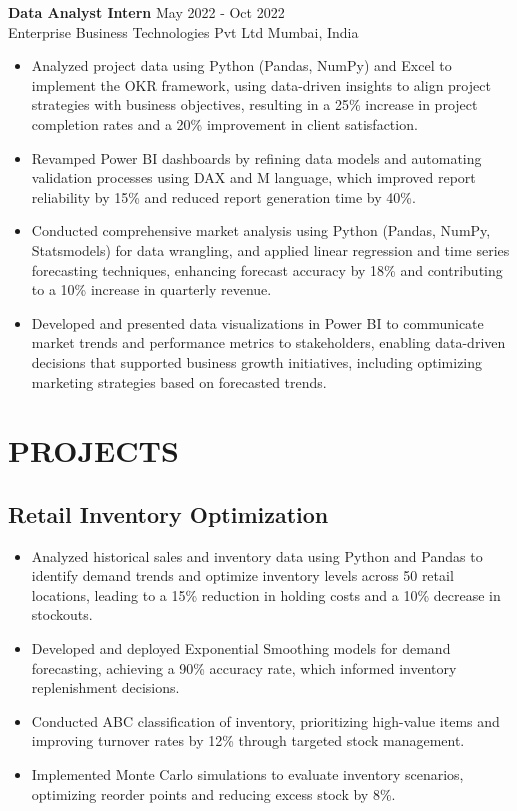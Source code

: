 \documentclass[12pt,a4paper]{article}
\newcommand{\workexp}[4]{
  \textbf{#1} \hfill #2\\
  #3 \hfill #4\\
  \vspace{-1em} %
}
\begin{document}
\workexp{Data Analyst Intern}{May 2022 - Oct 2022}{Enterprise Business Technologies Pvt Ltd}{Mumbai, India}
\begin{itemize}[leftmargin=*,noitemsep,topsep=0pt]
\item Analyzed project data using Python (Pandas, NumPy) and Excel to implement the OKR framework, using data-driven insights to align project strategies with business objectives, resulting in a 25\% increase in project completion rates and a 20\% improvement in client satisfaction.
\item Revamped Power BI dashboards by refining data models and automating validation processes using DAX and M language, which improved report reliability by 15\% and reduced report generation time by 40\%.
\item Conducted comprehensive market analysis using Python (Pandas, NumPy, Statsmodels) for data wrangling, and applied linear regression and time series forecasting techniques, enhancing forecast accuracy by 18\% and contributing to a 10\% increase in quarterly revenue.
\item Developed and presented data visualizations in Power BI to communicate market trends and performance metrics to stakeholders, enabling data-driven decisions that supported business growth initiatives, including optimizing marketing strategies based on forecasted trends.
\end{itemize}

\section*{PROJECTS}

\subsection*{Retail Inventory Optimization}
\begin{itemize}[leftmargin=*,noitemsep,topsep=0pt]
\item Analyzed historical sales and inventory data using Python and Pandas to identify demand trends and optimize inventory levels across 50 retail locations, leading to a 15\% reduction in holding costs and a 10\% decrease in stockouts.
\item Developed and deployed Exponential Smoothing models for demand forecasting, achieving a 90\% accuracy rate, which informed inventory replenishment decisions.
\item Conducted ABC classification of inventory, prioritizing high-value items and improving turnover rates by 12\% through targeted stock management.
\item Implemented Monte Carlo simulations to evaluate inventory scenarios, optimizing reorder points and reducing excess stock by 8\%.
\end{itemize}
\end{document}
